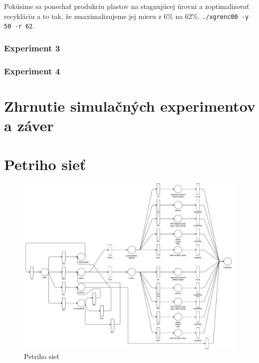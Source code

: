 \documentclass[a4paper, 11pt]{article}
\begin{document}
Pokúsime sa ponechať produkciu plastov na stagnujúcej úrovni a zoptimalizovať recykláciu a to tak, že zmaximalizujeme jej mieru z 6\% na 62\%.
\texttt{./xgrenc00 -y 50 -r 62}.

\subsubsection{Experiment 3}



\subsubsection{Experiment 4}



\pagebreak
\section{Zhrnutie simulačných experimentov a záver}



\clearpage

\renewcommand{\refname}{Literatúra}


\clearpage
\appendix

\section{Petriho sieť}
\label{appendix:petri_net}

\begin{figure}[ht]
	\centering
	\includegraphics[width=1 \linewidth]{IMSpetri.pdf}
	\caption{Petriho sieť}
\end{figure}
\end{document}
